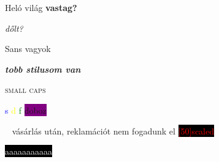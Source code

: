 \documentclass[]{article}
\begin{document}
Heló világ
\textbf{vastag?}


\textit{dőlt?}


\textsf{Sans vagyok}


\textbf{\textit{tobb stilusom van}}


\scshape{small caps}

\framebox[5cm]{\textcolor{red}{a}}
\textcolor{blue}{s}
\textcolor{yellow}{d}
\textcolor{green}{f}
\colorbox{purple}{doboz}

\	\huge\textbf{\textcolor{pink}{}}
\tiny vásárlás után, reklamációt nem fogadunk el
\huge
{} {}
\colorbox{black}{\textcolor {red} {\scalebox {5} [50]{scaled}}}

\colorbox{black}{\textcolor{white}{aaaaaaaaaaa}}
\end{document}
